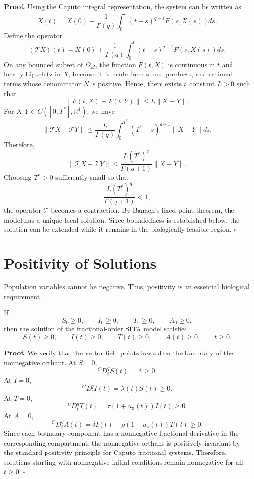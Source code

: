 \documentclass[12pt,a4paper,oneside]{report}
\newcommand{\CaputoD}[2]{{}^{C}D_{#1}^{#2}}
\begin{document}
\noindent\textbf{Proof.}
Using the Caputo integral representation, the system can be written as
\[
X(t)=X(0)+\frac{1}{\Gamma(q)}
\int_0^t(t-s)^{q-1}F(s,X(s))ds.
\]
Define the operator
\[
(\mathcal{T}X)(t)=X(0)+\frac{1}{\Gamma(q)}
\int_0^t(t-s)^{q-1}F(s,X(s))ds.
\]
On any bounded subset of $\Omega_M$, the function $F(t,X)$ is continuous in $t$ and locally Lipschitz in $X$, because it is made from sums, products, and rational terms whose denominator $N$ is positive. Hence, there exists a constant $L>0$ such that
\[
\|F(t,X)-F(t,Y)\|\leq L\|X-Y\|.
\]
For $X,Y\in C([0,T^*],\mathbb{R}^4)$, we have
\[
\|\mathcal{T}X-\mathcal{T}Y\|
\leq
\frac{L}{\Gamma(q)}
\int_0^{T^*}(T^*-s)^{q-1}\|X-Y\|ds.
\]
Therefore,
\[
\|\mathcal{T}X-\mathcal{T}Y\|
\leq
\frac{L(T^*)^q}{\Gamma(q+1)}\|X-Y\|.
\]
Choosing $T^*>0$ sufficiently small so that
\[
\frac{L(T^*)^q}{\Gamma(q+1)}<1,
\]
the operator $\mathcal{T}$ becomes a contraction. By Banach's fixed point theorem, the model has a unique local solution. Since boundedness is established below, the solution can be extended while it remains in the biologically feasible region. \hfill$\square$

\section{Positivity of Solutions}

Population variables cannot be negative. Thus, positivity is an essential biological requirement.

\begin{resultbox}[title={Theorem 4.2 --- Positivity}]
If
\[
S_0\geq0,\qquad I_0\geq0,\qquad T_0\geq0,\qquad A_0\geq0,
\]
then the solution of the fractional-order SITA model satisfies
\[
S(t)\geq0,\qquad I(t)\geq0,\qquad T(t)\geq0,\qquad A(t)\geq0,
\qquad t\geq0.
\]
\end{resultbox}

\noindent\textbf{Proof.}
We verify that the vector field points inward on the boundary of the nonnegative orthant. At $S=0$,
\[
\CaputoD{t}{q}S(t)=\Lambda\geq0.
\]
At $I=0$,
\[
\CaputoD{t}{q}I(t)=\lambda(t)S(t)\geq0.
\]
At $T=0$,
\[
\CaputoD{t}{q}T(t)=\tau(1+u_3(t))I(t)\geq0.
\]
At $A=0$,
\[
\CaputoD{t}{q}A(t)=\delta I(t)+\rho(1-u_4(t))T(t)\geq0.
\]
Since each boundary component has a nonnegative fractional derivative in the corresponding compartment, the nonnegative orthant is positively invariant by the standard positivity principle for Caputo fractional systems. Therefore, solutions starting with nonnegative initial conditions remain nonnegative for all $t\geq0$. \hfill$\square$
\end{document}
